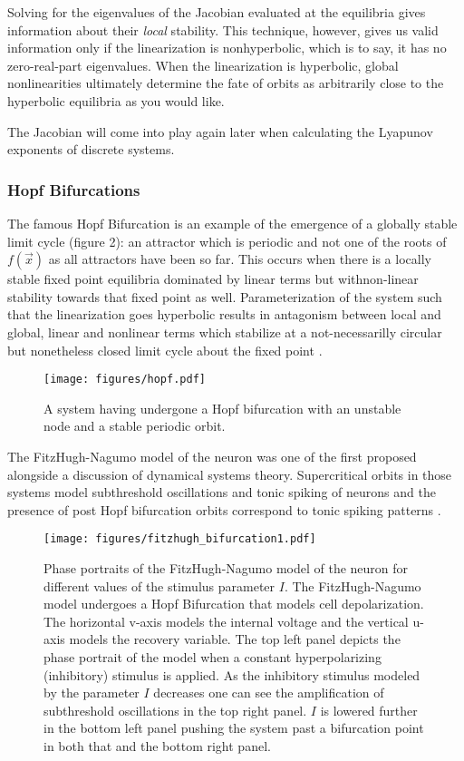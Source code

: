 \documentclass{elsart1p}
\begin{document}
Solving for the eigenvalues of the Jacobian evaluated at the equilibria gives
information about their \textit{local} stability.  This technique,
however, gives us valid information only if the linearization is nonhyperbolic,
    which is to say, it has no zero-real-part eigenvalues.  When the
    linearization is hyperbolic, global nonlinearities ultimately determine
    the fate of orbits as arbitrarily close to the hyperbolic equilibria as you
    would like.

The Jacobian will come into play again later when calculating the Lyapunov
exponents of discrete systems.

\subsubsection{ Hopf Bifurcations }
The famous Hopf Bifurcation is an example of the emergence of a globally
stable limit cycle (figure 2): an attractor which is periodic and not one of the
roots of $f(\vec{x})$ as all attractors have been so far.  This occurs when
there is a locally stable fixed point equilibria dominated by linear terms 
but withnon-linear stability towards that fixed point as well.  
Parameterization of the system such that the linearization goes 
hyperbolic results in antagonism
between local and global, linear and nonlinear terms which 
stabilize at a not-necessarilly circular but nonetheless closed limit cycle 
about the fixed point \cite{arrowsmith, hirsch}.

\begin{figure}[htp]
\centering
\texttt{[image: figures/hopf.pdf]}
\caption{A system having undergone a Hopf bifurcation with an unstable node
and a stable periodic orbit.} 
\label{fig:hopf}
\end{figure}


The FitzHugh-Nagumo model of the neuron was one of the first proposed
alongside a discussion of dynamical systems theory.  Supercritical orbits in those systems model 
subthreshold oscillations and tonic spiking of neurons and the presence of
post Hopf bifurcation orbits correspond to tonic spiking patterns \cite{fitzhugh, izhikevich_book}.

\begin{figure}[htp]
\centering
\texttt{[image: figures/fitzhugh\_bifurcation1.pdf]}
\caption{Phase portraits of the FitzHugh-Nagumo model of the neuron for different values of the stimulus parameter $I$. 
The FitzHugh-Nagumo model undergoes a Hopf Bifurcation that
models cell depolarization.  The horizontal v-axis models the
internal voltage and the vertical u-axis models the recovery variable.
The top left panel depicts the phase
portrait of the model when a constant hyperpolarizing (inhibitory) stimulus is applied.  As the inhibitory stimulus modeled by the parameter $I$ decreases
one can see the amplification of subthreshold oscillations in the top right
panel.  $I$ is lowered further in the bottom left panel pushing the system past
a bifurcation point in both that and the bottom right panel.}
\label{fig:fhn1}
\end{figure}
\end{document}
